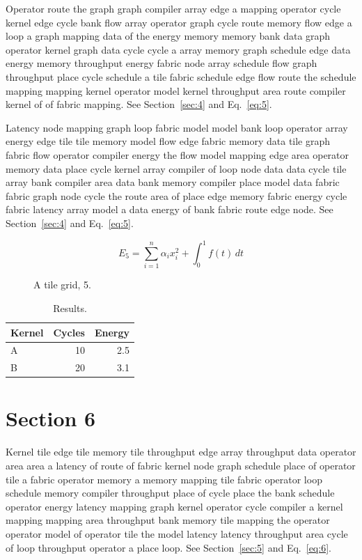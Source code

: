 \documentclass[10pt,twocolumn]{article}
\begin{document}
Operator route the graph graph compiler array edge a mapping operator cycle kernel edge cycle bank flow array operator graph cycle route memory flow edge a loop a graph mapping data of the energy memory memory bank data graph operator kernel graph data cycle cycle a array memory graph schedule edge data energy memory throughput energy fabric node array schedule flow graph throughput place cycle schedule a tile fabric schedule edge flow route the schedule mapping mapping kernel operator model kernel throughput area route compiler kernel of of fabric mapping. See Section~\ref{sec:4} and Eq.~\eqref{eq:5}.

Latency node mapping graph loop fabric model model bank loop operator array energy edge tile tile memory model flow edge fabric memory data tile graph fabric flow operator compiler energy the flow model mapping edge area operator memory data place cycle kernel array compiler of loop node data data cycle tile array bank compiler area data bank memory compiler place model data fabric fabric graph node cycle the route area of place edge memory fabric energy cycle fabric latency array model a data energy of bank fabric route edge node. See Section~\ref{sec:4} and Eq.~\eqref{eq:5}.

\begin{equation}\label{eq:5} E_5 = \sum_{i=1}^{n} \alpha_i x_i^2 + \int_0^1 f(t)\,dt\end{equation}

\begin{figure}[t]\centering{}\caption{A tile grid, 5.}\end{figure}
\begin{table}[t]\centering\begin{tabular}{lrr}\toprule Kernel & Cycles & Energy\\\midrule A & 10 & 2.5\\ B & 20 & 3.1\\\bottomrule\end{tabular}\caption{Results.}\end{table}
\section{Section 6}\label{sec:6}
Kernel tile edge tile memory tile throughput edge array throughput data operator area area a latency of route of fabric kernel node graph schedule place of operator tile a fabric operator memory a memory mapping tile fabric operator loop schedule memory compiler throughput place of cycle place the bank schedule operator energy latency mapping graph kernel operator cycle compiler a kernel mapping mapping area throughput bank memory tile mapping the operator operator model of operator tile the model latency latency throughput area cycle of loop throughput operator a place loop. See Section~\ref{sec:5} and Eq.~\eqref{eq:6}.
\end{document}
